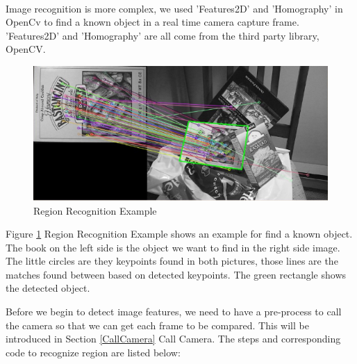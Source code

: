 \paragraph{}Image recognition is more complex, we used {\ttfamily 'Features2D'} and {\ttfamily 'Homography'} in OpenCv to find a known object in a real time camera capture frame. {\ttfamily 'Features2D'} and {\ttfamily 'Homography'} are all come from the third party library, OpenCV. 
\begin{figure}[htb]
\centering
\includegraphics[width=1\textwidth]{section04/assets/RegionRecognition.png}
\caption[Region Recognition Example]{\label{RegionRecognitionExample}Region Recognition Example}
\end{figure}
\par Figure \ref{RegionRecognitionExample} Region Recognition Example shows an example for find a known object. The book on the left side is the object we want to find in the right side image. The little circles are they keypoints found in both pictures, those lines are the matches found between based on detected keypoints. The green rectangle shows the detected object.
\par Before we begin to detect image features, we need to have a pre-process to call the camera so that we can get each frame to be compared. This will be introduced in Section \ref{CallCamera} Call Camera. The steps and corresponding code to recognize region are listed below:
